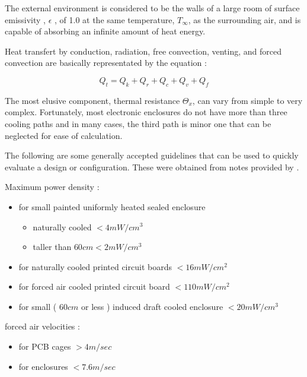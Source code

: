 The external environment is considered to be the walls of a large
room of surface emissivity , $\epsilon$ , of 1.0 at the same
temperature, $T_\infty$, as the surrounding air, and is capable of
absorbing an infinite amount of heat energy.

Heat transfert by conduction, radiation, free convection, venting,
and forced convection are basically representated by the equation :

\begin{equation}
Q_t = Q_k + Q_r + Q_c + Q_v + Q_f
\end{equation}

The most elusive component, thermal resistance $\Theta_x$, can vary
from simple to very complex. Fortunately, most electronic enclosures
do not have more than three cooling paths and in many cases, the
third path is minor one that can be neglected for ease of
calculation.

The following are some generally accepted guidelines that can be
used to quickly evaluate a design or configuration. These were
obtained from notes provided by \cite{spinelli}.

Maximum power density :

\begin{itemize}

\item
for small painted uniformly heated sealed enclosure
	\begin{itemize}
	\item naturally cooled $< 4 mW/cm^3$
	\item taller than $60 cm < 2 mW/cm^3$
	\end{itemize}

\item
for naturally cooled printed circuit boards $< 16 mW/cm^2$

\item
for forced air cooled printed circuit board $< 110 mW/cm^2$

\item
for small ( $60cm$ or less ) induced draft cooled enclosure $< 20 mW/cm^3$

\end{itemize}

forced air velocities :

\begin{itemize}
\item for PCB cages $> 4 m/sec$
\item for enclosures $< 7.6 m/sec$
\end{itemize}

